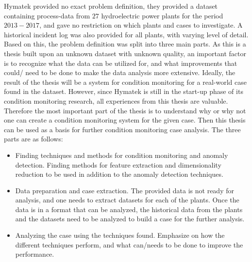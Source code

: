 
Hymatek provided no exact problem definition, they provided a dataset containing process-data from $27$ hydroelectric power plants for the period $2013-2017$, and gave no restriction on which plants and cases to investigate. A historical incident log was also provided for all plants, with varying level of detail. Based on this, the problem definition was split into three main parts. As this is a thesis built upon an unknown dataset with unknown quality, an important factor is to recognize what the data can be utilized for, and what improvements that could/ need to be done to make the data analysis more extensive. Ideally, the result of the thesis will be a system for condition monitoring for a real-world case found in the dataset. However, since Hymatek is still in the start-up phase of its condition monitoring research, all experiences from this thesis are valuable. Therefore the most important part of the thesis is to understand why or why not one can create a condition monitoring system for the given case. Then this thesis can be used as a basis for further condition monitoring case analysis. The three parts are as follows: 

\begin{itemize}
    \item Finding techniques and methods for condition monitoring and anomaly detection. Finding methods for feature extraction and dimensionality reduction to be used in addition to the anomaly detection techniques.
    \item Data preparation and case extraction. The provided data is not ready for analysis, and one needs to extract datasets for each of the plants. Once the data is in a format that can be analyzed, the historical data from the plants and the datasets need to be analyzed to build a  case for the further analysis. 
    \item Analyzing the case using the techniques found. Emphasize on how the different techniques perform, and what can/needs to be done to improve the performance. 
\end{itemize}


